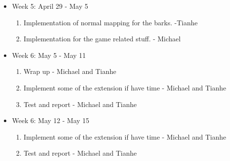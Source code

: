 \documentclass[annual]{acmsiggraph}
\begin{document}
\begin{itemize}
\item{Week 5: April 29 - May 5}

\begin{enumerate}
\item{Implementation of normal mapping for the barks. -Tianhe }
\item{Implementation for the game related stuff. - Michael}

\end{enumerate}

\item{Week 6: May 5 - May 11}

\begin{enumerate}
\item{Wrap up - Michael and Tianhe}
\item{Implement some of the extension if have time - Michael and Tianhe}
\item{Test and report - Michael and Tianhe}
\end{enumerate}

\item{Week 6: May 12 - May 15}

\begin{enumerate}
\item{Implement some of the extension if have time - Michael and Tianhe}
\item{Test and report - Michael and Tianhe}
\end{enumerate}

\end{itemize}




\end{document}
